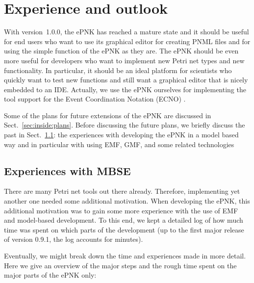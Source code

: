 \chapter{Experience and outlook}
\label{chap:inside}

With version~1.0.0, the ePNK has reached a mature state and it should be
useful for end users who want to use its graphical editor for creating
PNML files and for using the simple function of the ePNK as they are.
The ePNK should be even more useful for developers who want to implement new
Petri net types and new functionality. In particular, it should be an ideal
platform for scientists who quickly want to test new functions and still want a
graphical editor that is nicely embedded to an IDE.
Actually, we use the ePNK ourselves for implementing the tool support for
the Event Coordination Notation (ECNO) \cite{Kin12b}.

Some of the plans for future extensions of the ePNK are discussed in
Sect.~\ref{sec:inside:plans}. Before discussing the future plans, we
briefly discuss the past in Sect.~\ref{sec:inside:experiences}:
the experiences with developing the ePNK in a model based way and in particular
with using EMF, GMF, and some related technologies

\section{Experiences with MBSE}
\label{sec:inside:experiences}

There are many Petri net tools out there already. Therefore, implementing
yet another one needed some additional motivation. When developing
the ePNK, this additional motivation was to gain some more experience with
the use of EMF and model-based development. To this end, we kept a
detailed log of how much time was spent on which parts of the development
(up to the first major release of version 0.9.1, the log accounts for
minutes).

Eventually, we might break down the time and experiences made in more detail.
Here we give an overview of the major steps and the rough time spent on
the major parts of the ePNK only:


